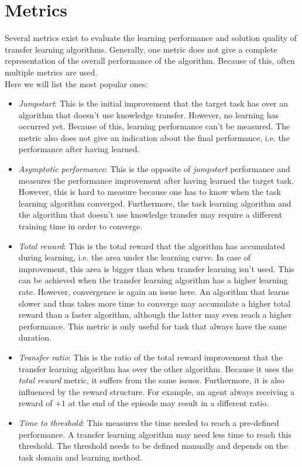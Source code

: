 \section{Metrics}
\label{sub:tl_metrics}
Several metrics exist to evaluate the learning performance and solution quality of transfer learning algorithms. Generally, one metric does not give a complete representation of the overall performance of the algorithm. Because of this, often multiple metrics are used.\\
Here we will list the most popular ones:
\begin{itemize}
    \item \textit{Jumpstart}: This is the initial improvement that the target task has over an algorithm that doesn't use knowledge transfer. However, no learning has occurred yet. Because of this, learning performance can't be measured. The metric also does not give an indication about the final performance, i.e. the performance after having learned.
    \item \textit{Asymptotic performance}: This is the opposite of \textit{jumpstart} performance and measures the performance improvement after having learned the target task. However, this is hard to measure because one has to know when the task learning algorithm converged. Furthermore, the task learning algorithm and the algorithm that doesn't use knowledge transfer may require a different training time in order to converge.
    \item \textit{Total reward}: This is the total reward that the algorithm has accumulated during learning, i.e. the area under the learning curve. In case of improvement, this area is bigger than when transfer learning isn't used. This can be achieved when the transfer learning algorithm has a higher learning rate.
    However, convergence is again an issue here. An algorithm that learns slower and thus takes more time to converge may accumulate a higher total reward than a faster algorithm, although the latter may even reach a higher performance. This metric is only useful for task that always have the same duration.
    \item \textit{Transfer ratio}: This is the ratio of the total reward improvement that the transfer learning algorithm has over the other algorithm. Because it uses the \textit{total reward} metric, it suffers from the same issues. Furthermore, it is also influenced by the reward structure. For example, an agent always receiving a reward of $+1$ at the end of the episode may result in a different ratio.
    \item \textit{Time to threshold}: This measures the time needed to reach a pre-defined performance. A transfer learning algorithm may need less time to reach this threshold. The threshold needs to be defined manually and depends on the task domain and learning method.
\end{itemize}
